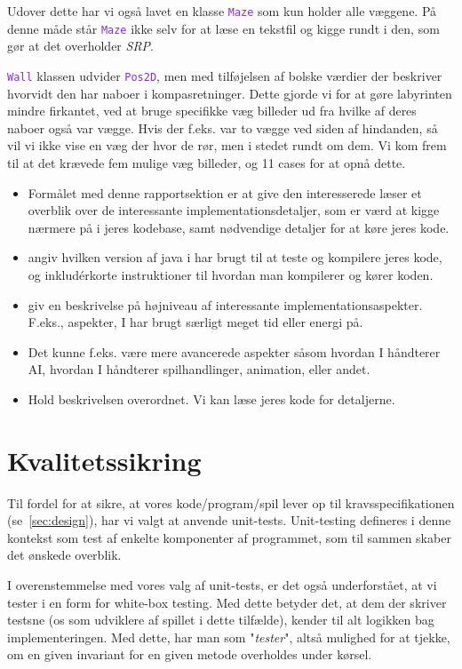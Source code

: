 \documentclass{article}
\newcommand{\class}[1]{\textcolor{BlueViolet}{\small\texttt{#1}}}
\theoremstyle{mytheoremstyle}
\theoremstyle{mytheoremstyle}
\theoremstyle{myproblemstyle}
\begin{document}
Udover dette har vi også lavet en klasse \class{Maze} som kun holder alle
væggene. På denne måde står \class{Maze} ikke selv for at læse en tekstfil og
kigge rundt i den, som gør at det overholder \textit{SRP}. 

\class{Wall} klassen udvider \class{Pos2D}, men med tilføjelsen af bolske
værdier der beskriver hvorvidt den har naboer i kompasretninger. Dette gjorde vi
for at gøre labyrinten mindre firkantet, ved at bruge specifikke væg billeder ud
fra hvilke af deres naboer også var vægge. Hvis der f.eks. var to vægge ved
siden af hindanden, så vil vi ikke vise en væg der hvor de rør, men i stedet
rundt om dem. Vi kom frem til at det krævede fem mulige væg billeder, og 11
cases for at opnå dette. 


\begin{itemize}
  \item Formålet med denne rapportsektion er at give den interesserede læser et
  overblik over de interessante implementationsdetaljer, som er værd at kigge
  nærmere på i jeres kodebase, samt nødvendige detaljer for at køre jeres kode.
  \item angiv hvilken version af java i har brugt til at teste og kompilere
  jeres kode, og inkludérkorte instruktioner til hvordan man kompilerer og kører
  koden.
  \item giv en beskrivelse på højniveau af interessante implementationsaspekter.
  F.eks., aspekter, I har brugt særligt meget tid eller energi på.
  \item Det kunne f.eks. være mere avancerede aspekter såsom hvordan I håndterer
  AI, hvordan I håndterer spilhandlinger, animation, eller andet.
  \item Hold beskrivelsen overordnet. Vi kan læse jeres kode for detaljerne.
\end{itemize}

\newpage
\section{Kvalitetssikring}\label{sec:Kvalitetssikring} %
Til fordel for at sikre, at vores kode/program/spil lever op til
kravsspecifikationen (se \autoref{sec:design}), har vi valgt at anvende
unit-tests. Unit-testing defineres i denne kontekst som test af enkelte
komponenter af programmet, som til sammen skaber det ønskede overblik.

I overenstemmelse med vores valg af unit-tests, er det også underforstået, at vi
tester i en form for white-box testing. Med dette betyder det, at dem der
skriver testsne (os som udviklere af spillet i dette tilfælde), kender til alt
logikken bag implementeringen. Med dette, har man som "\textit{tester}", altså
mulighed for at tjekke, om en given invariant for en given metode overholdes
under kørsel.
\end{document}
